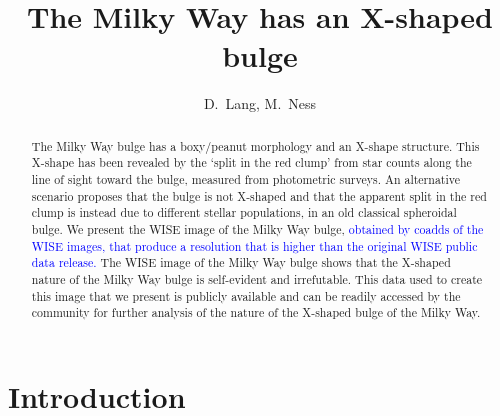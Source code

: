\documentclass[12pt, preprint]{aastex}
\begin{document}
\title{The Milky Way has an X-shaped bulge} 
\author{D.~Lang,
M.~Ness}

\begin{abstract}%
The Milky Way bulge has a boxy/peanut morphology and an X-shape structure. This X-shape has been revealed by the `split in the red clump' from 
star counts along the line of sight toward the bulge, measured from photometric surveys. An alternative scenario proposes that the bulge is not X-shaped and that the apparent split in the red clump is instead due to different stellar populations, in an old classical spheroidal bulge. We present the WISE image of the Milky Way bulge, \textcolor{blue}{obtained by coadds of the WISE images, that produce a resolution that is higher than the original WISE public data release. }The WISE image of the Milky Way bulge shows that the X-shaped nature of the Milky Way bulge is self-evident and irrefutable. This data used to create this image that we present is publicly available and can be readily accessed by the community for further analysis of the nature of the X-shaped bulge of the Milky Way. 
\end{abstract}

\keywords{%
}

\section{Introduction}\label{sec:Intro}
\end{document}

